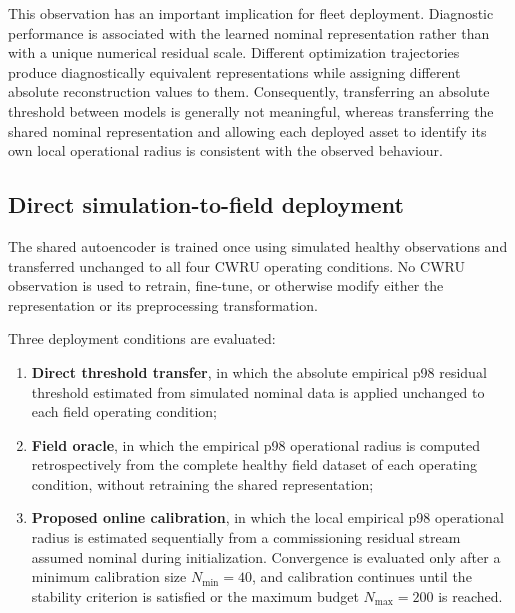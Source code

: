 \documentclass{trbunofficial}
\begin{document}
This observation has an important implication for fleet deployment.
Diagnostic performance is associated with the learned nominal
representation rather than with a unique numerical residual scale.
Different optimization trajectories produce diagnostically equivalent
representations while assigning different absolute reconstruction values to
them. Consequently, transferring an absolute threshold between models is
generally not meaningful, whereas transferring the shared nominal
representation and allowing each deployed asset to identify its own local
operational radius is consistent with the observed behaviour.

\subsection{Direct simulation-to-field deployment}
\label{sec:shared-deployment-results}

The shared autoencoder is trained once using simulated healthy observations
and transferred unchanged to all four CWRU operating conditions. No CWRU
observation is used to retrain, fine-tune, or otherwise modify either the
representation or its preprocessing transformation.

Three deployment conditions are evaluated:

\begin{enumerate}[leftmargin=1.5em]

    \item \textbf{Direct threshold transfer}, in which the absolute empirical
    p98 residual threshold estimated from simulated nominal data is applied
    unchanged to each field operating condition;

    \item \textbf{Field oracle}, in which the empirical p98 operational radius
    is computed retrospectively from the complete healthy field dataset of
    each operating condition, without retraining the shared representation;

    \item \textbf{Proposed online calibration}, in which the local empirical
    p98 operational radius is estimated sequentially from a commissioning
    residual stream assumed nominal during initialization. Convergence is
    evaluated only after a minimum calibration size $N_{\min}=40$, and
    calibration continues until the stability criterion is satisfied or the
    maximum budget $N_{\max}=200$ is reached.
\end{enumerate}
\end{document}
